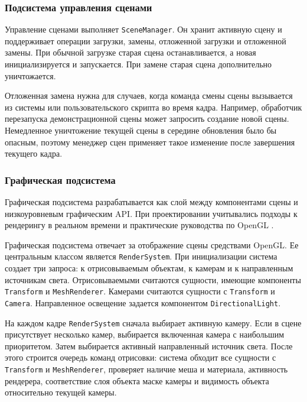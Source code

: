\subsubsection{Подсистема управления сценами}

Управление сценами выполняет \texttt{SceneManager}. Он хранит активную сцену и
поддерживает операции загрузки, замены, отложенной загрузки и отложенной замены.
При обычной загрузке старая сцена останавливается, а новая инициализируется и
запускается. При замене старая сцена дополнительно уничтожается.

Отложенная замена нужна для случаев, когда команда смены сцены вызывается из
системы или пользовательского скрипта во время кадра. Например, обработчик перезапуска демонстрационной сцены может запросить
создание новой сцены. Немедленное
уничтожение текущей сцены в середине обновления было бы опасным, поэтому
менеджер сцен применяет такое изменение после завершения текущего кадра.

\subsubsection{Графическая подсистема}

Графическая подсистема разрабатывается как слой между компонентами сцены и
низкоуровневым графическим API. При проектировании учитывались подходы к
рендерингу в реальном времени и практические руководства по OpenGL
\cite{realtime-rendering,eberly-engine,lengyel-rendering,opengl-programming-guide,opengl-superbible}.

Графическая подсистема отвечает за отображение сцены средствами OpenGL. Ее
центральным классом является \texttt{RenderSystem}. При инициализации система
создает три запроса: к отрисовываемым объектам, к камерам и к направленным
источникам света. Отрисовываемыми считаются сущности, имеющие компоненты
\texttt{Transform} и \texttt{MeshRenderer}. Камерами считаются сущности с
\texttt{Transform} и \texttt{Camera}. Направленное освещение задается компонентом
\texttt{DirectionalLight}.

На каждом кадре \texttt{RenderSystem} сначала выбирает активную камеру. Если
в сцене присутствует несколько камер, выбирается включенная камера с наибольшим
приоритетом. Затем выбирается активный направленный источник света. После
этого строится очередь команд отрисовки: система обходит все сущности с
\texttt{Transform} и \texttt{MeshRenderer}, проверяет наличие меша и материала,
активность рендерера, соответствие слоя объекта маске камеры и видимость
объекта относительно текущей камеры.

